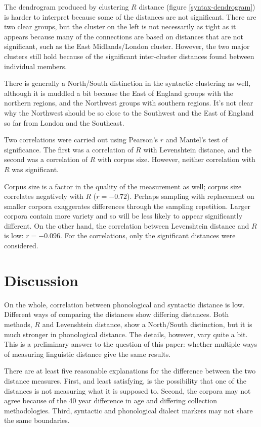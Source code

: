 \documentclass[11pt]{article}
\begin{document}
The dendrogram produced by clustering $R$ distance (figure
\ref{syntax-dendrogram}) is harder to interpret because some of the
distances are not significant. There are two clear groups, but the
cluster on the left is not necessarily as tight as it appears because
many of the connections are based on distances that are not
significant, such as the East Midlands/London cluster. However, the
two major clusters still hold because of the significant inter-cluster
distances found between individual members.

There is generally a North/South distinction in the syntactic
clustering as well, although it is muddled a bit because the East of
England groups with the northern regions, and the Northwest groups
with southern regions. It's not clear why the Northwest should be so
close to the Southwest and the East of England so far from London and
the Southeast.

Two correlations were carried out using Pearson's $r$ and Mantel's test of
significance. The first was a correlation of $R$ with Levenshtein
distance, and the second was a correlation of $R$ with corpus
size. However, neither correlation with $R$ was significant.

Corpus size is a factor in the quality of the measurement as well;
corpus size correlates negatively with $R$ ($r = -0.72$). Perhaps
sampling with replacement on smaller corpora exaggerates differences
through the sampling repetition. Larger corpora contain more variety and so will be
less likely to appear significantly different. On the other hand, the
correlation between Levenshtein distance and $R$ is low: $r=-0.096$. For
the correlations, only the significant distances were considered.

\section{Discussion}

On the whole, correlation between phonological and syntactic distance
is low. Different ways of comparing the distances show differing
distances. Both methods, $R$ and Levenshtein distance, show a
North/South distinction, but it is much stronger in phonological
distance. The details, however, vary quite a bit. This is a
preliminary answer to the question of this paper: whether multiple
ways of measuring linguistic distance give the same results.

There are at least five reasonable explanations for the difference
between the two distance measures. First, and
least satisfying, is the possibility that one of the distances is not
measuring what it is supposed to. Second, the corpora may not agree
because of the 40 year difference in age and differing collection
methodologies. Third, syntactic and phonological dialect markers may
not share the same boundaries.
\end{document}
